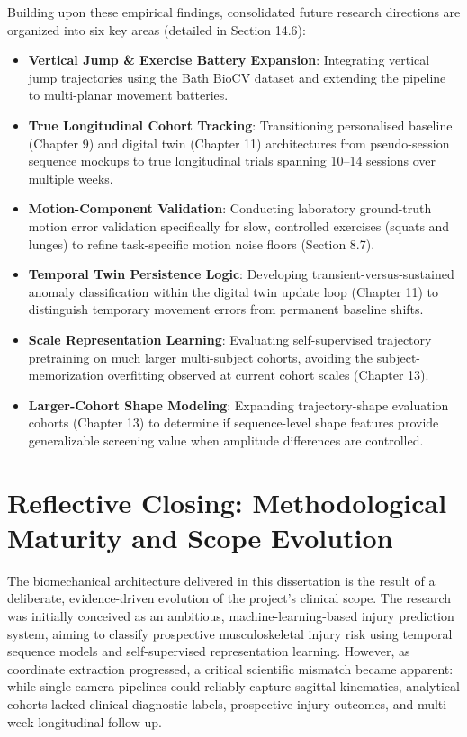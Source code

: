 Building upon these empirical findings, consolidated future research directions are organized into six key areas (detailed in Section 14.6):
\begin{itemize}
  \item \textbf{Vertical Jump \& Exercise Battery Expansion}: Integrating vertical jump trajectories using the Bath BioCV dataset and extending the pipeline to multi-planar movement batteries.
  \item \textbf{True Longitudinal Cohort Tracking}: Transitioning personalised baseline (Chapter 9) and digital twin (Chapter 11) architectures from pseudo-session sequence mockups to true longitudinal trials spanning 10–14 sessions over multiple weeks.
  \item \textbf{Motion-Component Validation}: Conducting laboratory ground-truth motion error validation specifically for slow, controlled exercises (squats and lunges) to refine task-specific motion noise floors (Section 8.7).
  \item \textbf{Temporal Twin Persistence Logic}: Developing transient-versus-sustained anomaly classification within the digital twin update loop (Chapter 11) to distinguish temporary movement errors from permanent baseline shifts.
  \item \textbf{Scale Representation Learning}: Evaluating self-supervised trajectory pretraining on much larger multi-subject cohorts, avoiding the subject-memorization overfitting observed at current cohort scales (Chapter 13).
  \item \textbf{Larger-Cohort Shape Modeling}: Expanding trajectory-shape evaluation cohorts (Chapter 13) to determine if sequence-level shape features provide generalizable screening value when amplitude differences are controlled.
\end{itemize}



\section{Reflective Closing: Methodological Maturity and Scope Evolution}
\label{sec:15-4-reflective-closing-methodological-maturity-and-scope-evolution}

The biomechanical architecture delivered in this dissertation is the result of a deliberate, evidence-driven evolution of the project's clinical scope. The research was initially conceived as an ambitious, machine-learning-based injury prediction system, aiming to classify prospective musculoskeletal injury risk using temporal sequence models and self-supervised representation learning. However, as coordinate extraction progressed, a critical scientific mismatch became apparent: while single-camera pipelines could reliably capture sagittal kinematics, analytical cohorts lacked clinical diagnostic labels, prospective injury outcomes, and multi-week longitudinal follow-up.

